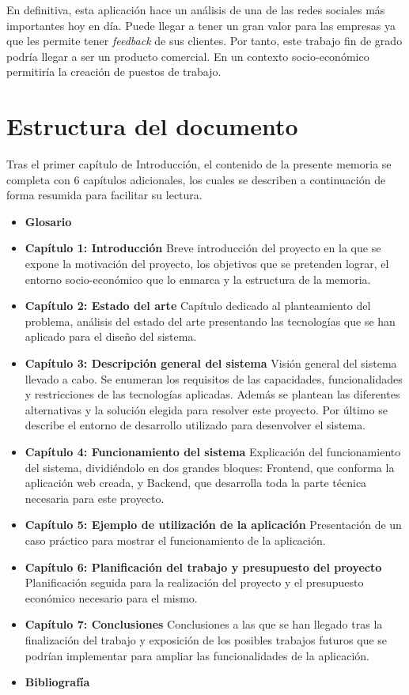 En definitiva, esta aplicación hace un análisis de una de las redes sociales más importantes hoy en día. Puede llegar a tener un gran valor para las empresas ya que les permite tener \textit{feedback} de sus clientes. Por tanto, este trabajo fin de grado podría llegar a ser un producto comercial. En un contexto socio-económico permitiría la creación de puestos de trabajo.

\section{Estructura del documento}

Tras el primer capítulo de Introducción, el contenido de la presente memoria se completa con 6 capítulos adicionales, los cuales se describen a continuación de forma resumida para facilitar su lectura.

\begin{itemize} \itemsep4pt \parskip0pt
\item \textbf{Glosario}
\item \textbf{Capítulo 1: Introducción} Breve introducción del proyecto en la que se expone la motivación del proyecto, los objetivos que se pretenden lograr, el entorno socio-económico que lo enmarca y la estructura de la memoria.
\item \textbf{Capítulo 2: Estado del arte} Capítulo dedicado al planteamiento del problema, análisis del estado del arte presentando las tecnologías que se han aplicado para el diseño del sistema.
\item \textbf{Capítulo 3: Descripción general del sistema} Visión general del sistema llevado a cabo. Se enumeran los requisitos de las capacidades, funcionalidades y restricciones de las tecnologías aplicadas. Además se plantean las diferentes alternativas y la solución elegida para resolver este proyecto. Por último se describe el entorno de desarrollo utilizado para desenvolver el sistema.
\item \textbf{Capítulo 4: Funcionamiento del sistema} Explicación del funcionamiento del sistema, dividiéndolo en dos grandes bloques: Frontend, que conforma la aplicación web creada, y Backend, que desarrolla toda la parte técnica necesaria para este proyecto.
\item \textbf{Capítulo 5: Ejemplo de utilización de la aplicación} Presentación de un caso práctico para mostrar el funcionamiento de la aplicación.
\item \textbf{Capítulo 6: Planificación del trabajo y presupuesto del proyecto} Planificación seguida para la realización del proyecto y el presupuesto económico necesario para el mismo.
\item \textbf{Capítulo 7: Conclusiones} Conclusiones a las que se han llegado tras la finalización del trabajo y exposición de los posibles trabajos futuros que se podrían implementar para ampliar las funcionalidades de la aplicación.
\item \textbf{Bibliografía}
\end{itemize}

